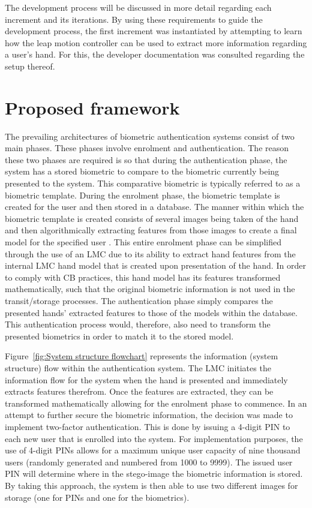 	
The development process will be discussed in more detail regarding each increment and its iterations.
By using these requirements to guide the development process, the first increment was instantiated by attempting to learn how the leap motion controller can be used to extract more information regarding a user’s hand. For this, the developer documentation was consulted regarding the setup thereof.

\section{Proposed framework}

The prevailing architectures of biometric authentication systems consist of two main phases. These phases involve enrolment and authentication. The reason these two phases are required is so that during the authentication phase, the system has a stored biometric to compare to the biometric currently being presented to the system. This comparative biometric is typically referred to as a biometric template. During the enrolment phase, the biometric template is created for the user and then stored in a database. The manner within which the biometric template is created consists of several images being taken of the hand and then algorithmically extracting features from those images to create a final model for the specified user \citep{Varchol2007}. This entire enrolment phase can be simplified through the use of an LMC due to its ability to extract hand features from the internal LMC hand model that is created upon presentation of the hand. In order to comply with CB practices, this hand model has its features transformed mathematically, such that the original biometric information is not used in the transit/storage processes. The authentication phase simply compares the presented hands’ extracted features to those of the models within the database. This authentication process would, therefore, also need to transform the presented biometrics in order to match it to the stored model.

Figure~\ref{fig:System structure flowchart} represents the information (system structure) flow within the authentication system. The LMC initiates the information flow for the system when the hand is presented and immediately extracts features therefrom. Once the features are extracted, they can be transformed mathematically allowing for the enrolment phase to commence. In an attempt to further secure the biometric information, the decision was made to implement two-factor authentication. This is done by issuing a 4-digit PIN to each new user that is enrolled into the system. For implementation purposes, the use of 4-digit PINs allows for a maximum unique user capacity of nine thousand users (randomly generated and numbered from 1000 to 9999). The issued user PIN will determine where in the stego-image the biometric information is stored. By taking this approach, the system is then able to use two different images for storage (one for PINs and one for the biometrics). 

